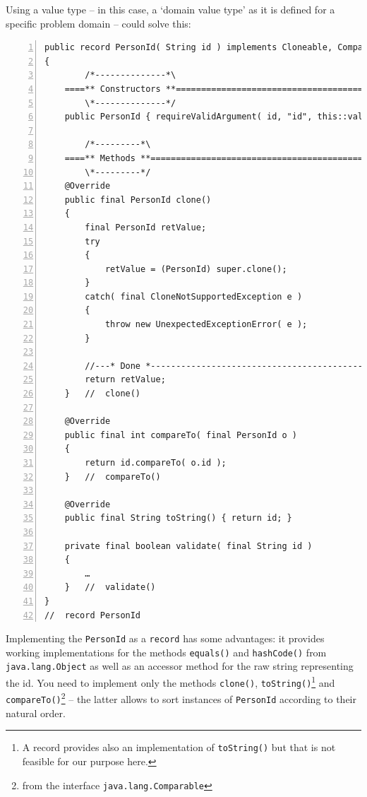 \documentclass[11pt,a4paper, titlepage, parskip=half, headsepline, footsepline, cleardoublepage=current, headheight=1cm]{scrbook}
\begin{document}
Using a value type – in this case, a ‘domain value type’ as it is defined for a specific problem domain – could solve this:
\begin{lstlisting}[numbers=left,caption={Value Type ‘PersonId’}]
public record PersonId( String id ) implements Cloneable, Comparable<PersonId>
{
        /*--------------*\
    ====** Constructors **===========================================
        \*--------------*/
    public PersonId { requireValidArgument( id, "id", this::validate ); }
    
        /*---------*\    
    ====** Methods **================================================
        \*---------*/
    @Override
    public final PersonId clone()
    {
        final PersonId retValue;
        try
        {
            retValue = (PersonId) super.clone();                                
        }
        catch( final CloneNotSupportedException e )
        {
            throw new UnexpectedExceptionError( e );
        }

        //---* Done *------------------------------------------------
        return retValue;
    }   //  clone()
        
    @Override
    public final int compareTo( final PersonId o )
    {
        return id.compareTo( o.id );
    }   //  compareTo()
    
    @Override
    public final String toString() { return id; }
        
    private final boolean validate( final String id )
    {
        …
    }   //  validate()
}
//  record PersonId
\end{lstlisting}

Implementing the \lstinline|PersonId| as a \lstinline|record| has some advantages\autocite{Eckel:JavaRecords}: it provides working implementations for the methods \lstinline|equals()|\autocite{ORACLE_DOC_OBJECT:equals} and \lstinline|hashCode()|\autocite{ORACLE_DOC_OBJECT:hashCode} from \lstinline|java.lang.Object|\autocite{ORACLE_DOC_OBJECT_CLASS} as well as an accessor method for the raw string representing the id. You need to implement only the methods \lstinline|clone()|\autocite{ORACLE_DOC_OBJECT:clone}, \lstinline|toString()|\autocite{ORACLE_DOC_OBJECT:toString}\footnote{A record provides also an implementation of \lstinline|toString()| but that is not feasible for our purpose here.} and \lstinline|compareTo()|\autocite{ORACLE_DOC_COMPARABALE:compareTo}\footnote{from the interface \lstinline|java.lang.Comparable|\autocite{ORACLE_DOC_COMPARABALE_INTERFACE}} – the latter allows to sort instances of \lstinline|PersonId| according to their natural order.
\end{document}
